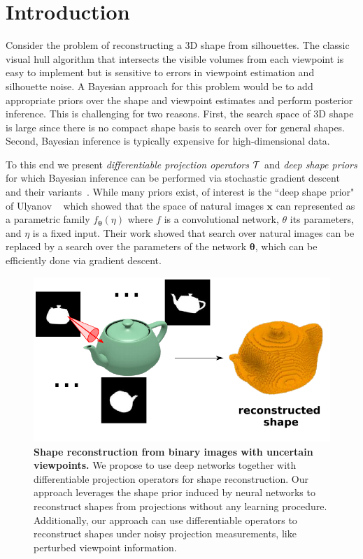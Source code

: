 \section{Introduction}
\label{sec:introduction}
Consider the problem of reconstructing a 3D shape from silhouettes. 
The classic visual hull algorithm that intersects the visible volumes
from each viewpoint is easy to implement but is sensitive to errors in
viewpoint estimation and silhouette noise.
A Bayesian approach for this problem would be to add appropriate
priors over the shape and viewpoint estimates and perform posterior
inference.
This is challenging for two reasons. First, the search space of 3D
shape is large since there is no compact shape basis to search
over for general shapes.
Second, Bayesian inference is typically expensive for high-dimensional data.

To this end we present \emph{differentiable projection operators}
$\cal{T}$ and \emph{deep shape priors} for which Bayesian inference
can be performed via stochastic gradient descent and their
variants~\cite{sgld}.
While many priors exist, of interest is the ``deep shape prior"
of Ulyanov \etal~\cite{ulyanov17deep} which showed that the space of
natural images $\bm{x}$ can represented as a parametric family
$f_{\bm{\theta}}(\eta)$ where $f$ is a convolutional network, $\theta$
its parameters, and $\eta$ is a fixed input. Their work showed that
search over natural images can be replaced by a search over the
parameters of the network $\bm{\theta}$, which can be efficiently done
via gradient descent.

\begin{figure}
\centering
\includegraphics[width=0.6\linewidth]{dsp/figs/splash.pdf}
\caption{\label{fig:splash}\small
\textbf{Shape reconstruction from binary images with uncertain viewpoints.}
    We propose to use deep networks together with differentiable projection operators for shape reconstruction.
    Our approach leverages the shape prior induced by neural networks to reconstruct shapes from projections
    without any learning procedure.
    Additionally, our approach can use differentiable operators to reconstruct shapes under noisy projection
    measurements, like perturbed viewpoint information.}
\vspace{-12pt}
\end{figure}


